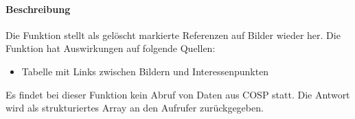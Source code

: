 \paragraph{Beschreibung} Die Funktion stellt als gelöscht markierte Referenzen auf Bilder wieder her. Die Funktion hat Auswirkungen auf folgende Quellen:
\begin{itemize}
	\item Tabelle mit Links zwischen Bildern und Interessenpunkten
\end{itemize}
Es findet bei dieser Funktion kein Abruf von Daten aus {\glqq COSP\grqq} statt. Die Antwort wird als strukturiertes Array an den Aufrufer zurückgegeben.